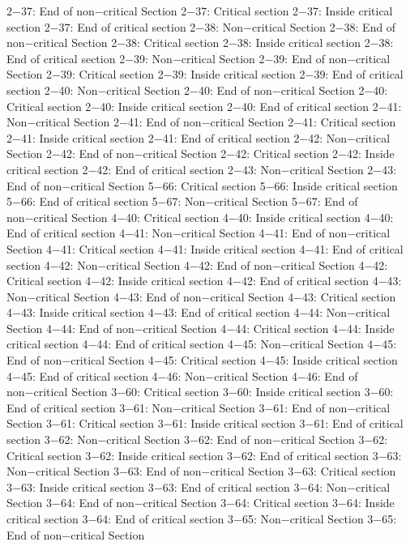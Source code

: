 2−37: End of non−critical Section
2−37: Critical section
2−37: Inside critical section
2−37: End of critical section
2−38: Non−critical Section
2−38: End of non−critical Section
2−38: Critical section
2−38: Inside critical section
2−38: End of critical section
2−39: Non−critical Section
2−39: End of non−critical Section
2−39: Critical section
2−39: Inside critical section
2−39: End of critical section
2−40: Non−critical Section
2−40: End of non−critical Section
2−40: Critical section
2−40: Inside critical section
2−40: End of critical section
2−41: Non−critical Section
2−41: End of non−critical Section
2−41: Critical section
2−41: Inside critical section
2−41: End of critical section
2−42: Non−critical Section
2−42: End of non−critical Section
2−42: Critical section
2−42: Inside critical section
2−42: End of critical section
2−43: Non−critical Section
2−43: End of non−critical Section
5−66: Critical section
5−66: Inside critical section
5−66: End of critical section
5−67: Non−critical Section
5−67: End of non−critical Section
4−40: Critical section
4−40: Inside critical section
4−40: End of critical section
4−41: Non−critical Section
4−41: End of non−critical Section
4−41: Critical section
4−41: Inside critical section
4−41: End of critical section
4−42: Non−critical Section
4−42: End of non−critical Section
4−42: Critical section
4−42: Inside critical section
4−42: End of critical section
4−43: Non−critical Section
4−43: End of non−critical Section
4−43: Critical section
4−43: Inside critical section
4−43: End of critical section
4−44: Non−critical Section
4−44: End of non−critical Section
4−44: Critical section
4−44: Inside critical section
4−44: End of critical section
4−45: Non−critical Section
4−45: End of non−critical Section
4−45: Critical section
4−45: Inside critical section
4−45: End of critical section
4−46: Non−critical Section
4−46: End of non−critical Section
3−60: Critical section
3−60: Inside critical section
3−60: End of critical section
3−61: Non−critical Section
3−61: End of non−critical Section
3−61: Critical section
3−61: Inside critical section
3−61: End of critical section
3−62: Non−critical Section
3−62: End of non−critical Section
3−62: Critical section
3−62: Inside critical section
3−62: End of critical section
3−63: Non−critical Section
3−63: End of non−critical Section
3−63: Critical section
3−63: Inside critical section
3−63: End of critical section
3−64: Non−critical Section
3−64: End of non−critical Section
3−64: Critical section
3−64: Inside critical section
3−64: End of critical section
3−65: Non−critical Section
3−65: End of non−critical Section
